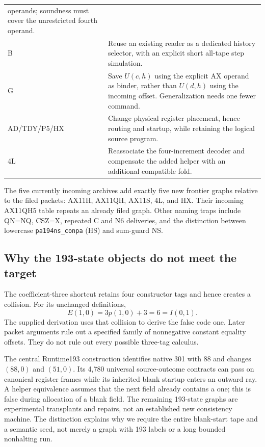 \documentclass[11pt]{article}
\theoremstyle{definition}\newtheorem{definition}[theorem]{Definition}
\begin{document}
\begin{longtable}{>{\raggedright\arraybackslash}p{.19\linewidth}p{.73\linewidth}}
operands; soundness must cover the unrestricted fourth operand.\\
B & Reuse an existing reader as a dedicated history selector, with an
explicit short all-tape step simulation.\\
G & Save $U(c,h)$ using the explicit AX operand as binder, rather than
$U(d,h)$ using the incoming offset. Generalization needs one fewer command.\\
AD/TDY/P5/HX & Change physical register placement, hence routing and
startup, while retaining the logical source program.\\
4L & Reassociate the four-increment decoder and compensate the added
helper with an additional compatible fold.\\
\bottomrule
\end{longtable}

The five currently incoming archives add exactly five new frontier graphs
relative to the filed packets: AX11H, AX11QH, AX11S, 4L, and HX. Their
incoming AX11QH5 table repeats an already filed graph. Other naming traps
include QN=NQ, CSZ=X, repeated C and N6 deliveries, and the distinction
between lowercase \texttt{pa194ns\_conpa} (HS) and sum-guard NS.

\subsection{Why the 193-state objects do not meet the target}

The coefficient-three shortcut retains four constructor tags and hence
creates a collision. For its unchanged definitions,
\[
 E(1,0)=3p(1,0)+3=6=I(0,1).
\]
The supplied derivation uses that collision to derive the false code one.
Later packet arguments rule out a specified family of nonnegative constant
equality offsets. They do not rule out every possible three-tag calculus.

The central Runtime193 construction identifies native 301 with 88 and
changes $(88,0)$ and $(51,0)$. Its 4,780 universal source-outcome contracts
can pass on canonical register frames while its inherited blank startup
enters an outward ray. A helper equivalence assumes that the next field
already contains a one; this is false during allocation of a blank field.
The remaining 193-state graphs are experimental transplants and repairs,
not an established new consistency machine. The distinction explains why
we require the entire blank-start tape and a semantic seed, not merely
a graph with 193 labels or a long bounded nonhalting run.
\end{document}
